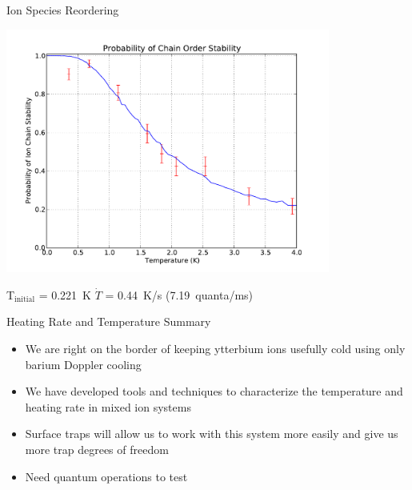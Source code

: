 \documentclass{beamer}
\begin{document}
\begin{frame}{Ion Species Reordering}
	\centerline{\includegraphics[width=0.8\textwidth]{Reordering81}}
	\centerline{T$_\mathrm{initial}$ = 0.221~K \;\; $\dot{T}$ = 0.44~K/s (7.19~quanta/ms)}
\end{frame}

\begin{frame}{Heating Rate and Temperature Summary}
	\begin{itemize}
		\item We are right on the border of keeping ytterbium ions usefully cold using only barium Doppler cooling
		\item We have developed tools and techniques to characterize the temperature and heating rate in mixed ion systems
		\item Surface traps will allow us to work with this system more easily and give us more trap degrees of freedom
		\item Need quantum operations to test
	\end{itemize}
\end{frame}
\end{document}
